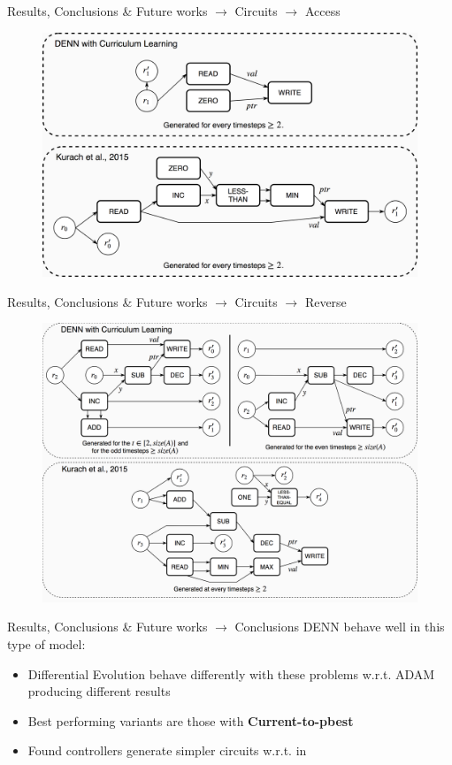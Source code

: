 \documentclass[xcolor={usenames}]{beamer}
\begin{document}
  \begin{frame}{Results, Conclusions \& Future works \(\rightarrow\) Circuits \(\rightarrow\) Access}
  	\begin{figure}
  		\centering
  		\includegraphics[width=\textwidth]{../figures/access-circuits.png}
  	\end{figure}
  \end{frame}
  \begin{frame}{Results, Conclusions \& Future works \(\rightarrow\) Circuits \(\rightarrow\) Reverse}
  	\begin{figure}
  		\centering
  		\includegraphics[width=\textwidth]{../figures/reverse-circuits.png}
  	\end{figure}
  \end{frame}
  \begin{frame}{Results, Conclusions \& Future works \(\rightarrow\) Conclusions}
  	DENN behave well in this type of model:
	\begin{itemize}
		\item{Differential Evolution behave differently with these problems w.r.t. ADAM producing different results}
		\item{Best performing variants are those with \textbf{Current-to-pbest}}
		\item{Found controllers generate simpler circuits w.r.t. in \cite{NRAM:2016}}
	\end{itemize}
  \end{frame}
\end{document}
